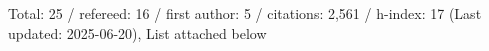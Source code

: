 Total: 25 / refereed: 16 / first author: 5 / citations: 2,561 / h-index: 17 (Last updated: 2025-06-20), List attached below